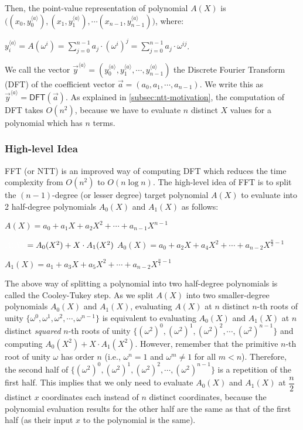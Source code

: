 Then, the point-value representation of polynomial $A(X)$ is $\bm ( ({x}_0, {y}_0^{\langle a \rangle}), ({x}_1, {y}_1^{\langle a \rangle}), \cdots ({x}_{n-1}, {y}_{n-1}^{\langle a \rangle}) \bm )$, where: 

${y}_i^{\langle a \rangle} = A(\omega^i) = \sum\limits_{j=0}^{n-1}a_{j}\cdot (\omega^i)^j = \sum\limits_{j=0}^{n-1}a_{j}\cdot \omega^{ij}$. 

We call the vector $\vec{y}^{\langle a \rangle} = (y_0^{\langle a \rangle}, y_1^{\langle a \rangle}, \cdots, y_{n-1}^{\langle a \rangle})$ the Discrete Fourier Transform (DFT) of the coefficient vector $\vec{a} = (a_0, a_1, \cdots, a_{n-1})$. We write this as $\vec{y}^{\langle a \rangle} = \textsf{DFT}(\vec{a})$. As explained in \autoref{subsec:ntt-motivation}, the computation of DFT takes $O(n^2)$, because we have to evaluate $n$ distinct $X$ values for a polynomial which has $n$ terms.

\subsubsection{High-level Idea}
\label{subsec:ntt-forward-overview}

FFT (or NTT) is an improved way of computing DFT which reduces the time complexity from $O(n^2)$ to $O(n \log n)$. The high-level idea of FFT is to split the $(n-1)$-degree (or lesser degree) target polynomial $A(X)$ to evaluate into 2 half-degree polynomials $A_0(X)$ and $A_1(X)$ as follows:


$A(X) = a_0 + a_1X + a_2X^2 + \cdots + a_{n-1}X^{n - 1}$

$\textcolor{white}{A(X) }= A_0(X^2) + X \cdot A_1(X^2)$
$A_0(X) = a_0 + a_2X + a_4X^2 + \cdots + a_{n-2}X^{\frac{n}{2} - 1}$

$A_1(X) = a_1 + a_3X + a_5X^2 + \cdots + a_{n-2}X^{\frac{n}{1} - 1}$

The above way of splitting a polynomial into two half-degree polynomials is called the Cooley-Tukey step. As we split $A(X)$ into two smaller-degree polynomials $A_0(X)$ and $A_1(X)$, evaluating $A(X)$ at $n$ distinct $n$-th roots of unity $\{\omega^0, \omega^1, \omega^2, \cdots, \omega^{n-1}\}$ is equivalent to evaluating $A_0(X)$ and $A_1(X)$ at $n$ distinct \textit{squared} $n$-th roots of unity $\{(\omega^2)^0, (\omega^2)^1, (\omega^2)^2, \cdots, (\omega^2)^{n-1}\}$ and computing $A_0(X^2) + X\cdot A_1(X^2)$. However, remember that the primitive $n$-th root of unity $\omega$ has order $n$ (i.e., $\omega^n = 1$ and $\omega^m \neq 1$ for all $m < n$). Therefore, the second half of $\{(\omega^2)^0, (\omega^2)^1, (\omega^2)^2, \cdots, (\omega^2)^{n-1}\}$ is a repetition of the first half. This implies that we only need to evaluate $A_0(X)$ and $A_1(X)$ at $\dfrac{n}{2}$ distinct $x$ coordinates each instead of $n$ distinct coordinates, because the polynomial evaluation results for the other half are the same as that of the first half (as their input $x$ to the polynomial is the same). 

